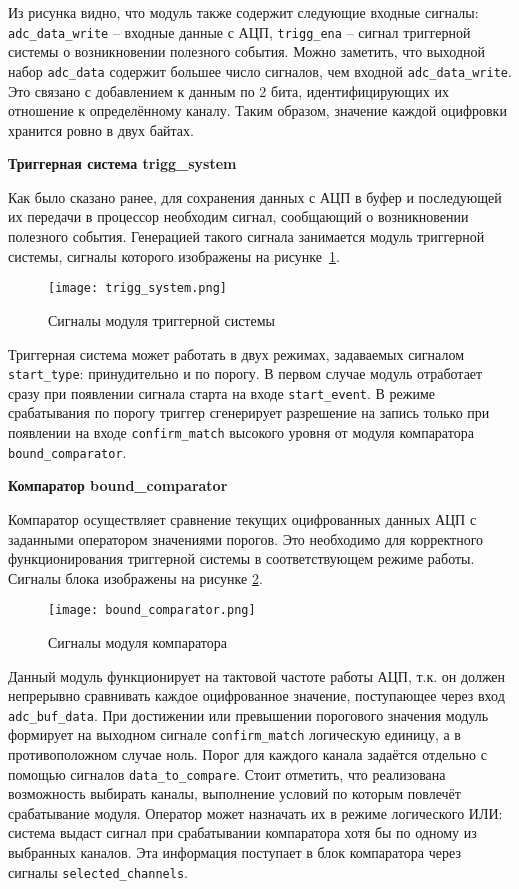 Из рисунка видно, что модуль также содержит следующие входные сигналы: \texttt{adc\_data\_write} -- входные данные с АЦП, \texttt{trigg\_ena} -- сигнал триггерной системы о возникновении полезного события. Можно заметить, что выходной набор \texttt{adc\_data} содержит большее число сигналов, чем входной \texttt{adc\_data\_write}. Это связано с добавлением к данным по 2 бита, идентифицирующих их отношение к определённому каналу. Таким образом, значение каждой оцифровки хранится ровно в двух байтах.\par
\textbf{Триггерная система trigg\_system}\par
Как было сказано ранее, для сохранения данных с АЦП в буфер и последующей их передачи в процессор необходим сигнал, сообщающий о возникновении полезного события. Генерацией такого сигнала занимается модуль триггерной системы, сигналы которого изображены на рисунке~\ref{fig:trigg_system}.\par
\begin{figure}[ht]
    \centering
    \texttt{[image: trigg\_system.png]}
    \caption{Сигналы модуля триггерной системы}
    \label{fig:trigg_system}
\end{figure}
Триггерная система может работать в двух режимах, задаваемых сигналом \texttt{start\_type}: принудительно и по порогу. В первом случае модуль отработает сразу при появлении сигнала старта на входе \texttt{start\_event}. В режиме срабатывания по порогу триггер сгенерирует разрешение на запись только при появлении на входе \texttt{confirm\_match} высокого уровня от модуля компаратора \texttt{bound\_comparator}.\par
\textbf{Компаратор bound\_comparator}\par
Компаратор осуществляет сравнение текущих оцифрованных данных АЦП с заданными оператором значениями порогов. Это необходимо для корректного функционирования триггерной системы в соответствующем режиме работы. Сигналы блока изображены на рисунке \ref{fig:bound_comparator}.\par
\begin{figure}[ht]
    \centering
    \texttt{[image: bound\_comparator.png]}
    \caption{Сигналы модуля компаратора}
    \label{fig:bound_comparator}
\end{figure}
Данный модуль функционирует на тактовой частоте работы АЦП, т.к. он должен непрерывно сравнивать каждое оцифрованное значение, поступающее через вход \texttt{adc\_buf\_data}. При достижении или превышении порогового значения модуль формирует на выходном сигнале \texttt{confirm\_match} логическую единицу, а в противоположном случае ноль. Порог для каждого канала задаётся отдельно с помощью сигналов \texttt{data\_to\_compare}. Стоит отметить, что реализована возможность выбирать каналы, выполнение условий по которым повлечёт срабатывание модуля. Оператор может назначать их в режиме логического ИЛИ: система выдаст сигнал при срабатывании компаратора хотя бы по одному из выбранных каналов. Эта информация поступает в блок компаратора через сигналы \texttt{selected\_channels}.\par
